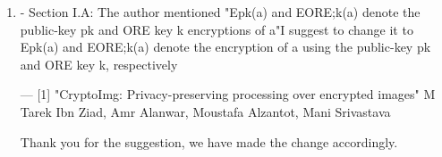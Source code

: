 \documentclass[a4paper]{scrartcl}
\newenvironment{rebuttal}{\begin{enumerate}[label={\color{grey}\thesection.\arabic{enumi}},leftmargin=0pt,ref=\thesection.\arabic{enumi}]}{\end{enumerate}}
\newcommand{\reviewtext}[1]{{\color{nblue} #1}}
\begin{document}
\begin{rebuttal}
We apologies for having not included any run times or a complexity analysis in the manuscript. We have added the new Section V.A which gives both homomorphic operation complexities and the complexity of the complete fusion algorithm. Additionally, we have noted the number of required comparisons in Section V.

\item \reviewtext{- Section I.A: The author mentioned 
"Epk(a) and EORE;k(a) denote the public-key pk and ORE key k
encryptions of a"I suggest to change it to 
Epk(a) and EORE;k(a) denote the encryption of a using the public-key pk
and ORE key k, respectively

---
[1] "CryptoImg: Privacy-preserving processing over encrypted images" M
Tarek Ibn Ziad, Amr Alanwar, Moustafa Alzantot, Mani Srivastava}

Thank you for the suggestion, we have made the change accordingly.

\end{rebuttal}

\end{document}
